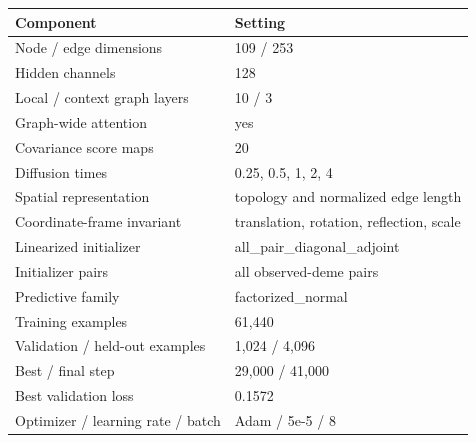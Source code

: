 \begin{tabular}{ll}
\toprule
Component & Setting \\
\midrule
Node / edge dimensions & 109 / 253 \\
Hidden channels & 128 \\
Local / context graph layers & 10 / 3 \\
Graph-wide attention & yes \\
Covariance score maps & 20 \\
Diffusion times & 0.25, 0.5, 1, 2, 4 \\
Spatial representation & topology and normalized edge length \\
Coordinate-frame invariant & translation, rotation, reflection, scale \\
Linearized initializer & all\_pair\_diagonal\_adjoint \\
Initializer pairs & all observed-deme pairs \\
Predictive family & factorized\_normal \\
Training examples & 61,440 \\
Validation / held-out examples & 1,024 / 4,096 \\
Best / final step & 29,000 / 41,000 \\
Best validation loss & 0.1572 \\
Optimizer / learning rate / batch & Adam / 5e-5 / 8 \\
\bottomrule
\end{tabular}
